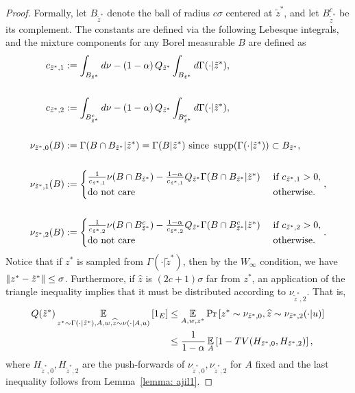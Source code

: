 \begin{proof}
		Formally, let $B_{\tilde{z}^*}$ denote the ball of radius $c
		 \sigma$ centered at $\tilde{z}^*$, and let $B^c_{\tilde{z}^*}$
		be its complement. The constants are defined via the following
		Lebesque integrals, and the mixture components for any Borel
		measurable $B$ are defined as
		\begin{align*}
		  c_{\tilde{z}^*, 1} &:= \int_{B_{\tilde{z}^*}} d\nu - \left( 1- \alpha \right) Q_{\tilde{z}^*} \int_{B_{\tilde{z}^*}} d\Gamma( \cdot | \tilde{z}^*)  ,\\
		  \nonumber\\
		  c_{\tilde{z}^*, 2} &:= \int_{B_{\tilde{z}^*}^c} d\nu - \left( 1- \alpha \right) Q_{\tilde{z}^*} \int_{B_{\tilde{z}^*}^c} d\Gamma( \cdot | \tilde{z}^*)  ,\\
		  \nonumber\\
		  \nu_{\tilde{z}^*, 0}(B) &:= \Gamma( B \cap B_{\tilde{z}^*} | \tilde{z}^*) = \Gamma( B  | \tilde{z}^*) \text{ since } \operatorname{supp}(\Gamma(\cdot | \tilde{z}^*)) \subset B_{\tilde{z}^*}, \\
		  \nonumber\\
		  \nu_{\tilde{z}^*, 1}(B) &:= \begin{cases}
		    \frac{ 1}{c_{\tilde{z}^*, 1}}  \nu( B \cap B_{\tilde{z}^*})  - \frac{ 1 - \alpha }{c_{\tilde{z}^*, 1}} Q_{\tilde{z}^*} \Gamma(  B \cap B_{\tilde{z}^*} | \tilde{z}^*)  & \text{ if } c_{\tilde{z}^*, 1} > 0,\\
		    \text{do not care } & \text{ otherwise.}
		  \end{cases},\\
		  \nonumber\\
		  \nu_{\tilde{z}^*, 2}(B) &:= \begin{cases}
		    \frac{ 1}{c_{\tilde{z}^*, 2}}  \nu( B \cap B^c_{\tilde{z}^*})  - \frac{ 1 - \alpha }{c_{\tilde{z}^*, 2}} Q_{\tilde{z}^*} \Gamma(  B \cap B^c_{\tilde{z}^*} | \tilde{z}^*)  & \text{ if } c_{\tilde{z}^*, 2} > 0,\\ \text{do not care } & \text{ otherwise.}
		  \end{cases}.
		\end{align*}
		Notice that if $z^*$ is sampled from $\Gamma(\cdot | \tilde{z}^*)$, then by the $W_\infty$ condition, we have $\| z^* - \tilde{z}^*\| \leq \sigma$. Furthermore, if $\widehat{z}$ is $\left( 2c+1 \right)\sigma $ far from $z^*$, an application of the triangle inequality implies that it must be distributed according to $\nu_{\tilde{z}^*,2}$.
    That is, 
    \begin{align*}
			Q ( \tilde{z}^*) \operatorname*{\mathbb{E}}_{z^*\sim \Gamma( \cdot | \tilde{z}^*) , A , w, \widehat{z} \sim \nu(\cdot | A,u) } \left[ {1}_E \right] & \leq \operatorname*{\mathbb{E}}_{A , w, z^*} \Pr \left[ z^* \sim \nu_{\tilde{z}^*,0}, \widehat{z} \sim \nu_{\tilde{z}^*,2}( \cdot | u) \right] \\
			& \leq \frac{1}{1-\alpha}\operatorname*{\mathbb{E}}_A \left[ 1 - TV( H_{\tilde{z}^*,0}, H_{\tilde{z}^*,2}) \right],
    \end{align*}
    where $H_{\tilde{z}^*,0}, H_{\tilde{z}^*,2}$ are the push-forwards of $\nu_{\tilde{z}^*,0}, \nu_{\tilde{z}^*,2}$ for $A$ fixed and the last inequality follows from Lemma~\ref{lemma: ajil1}.


\end{proof}
